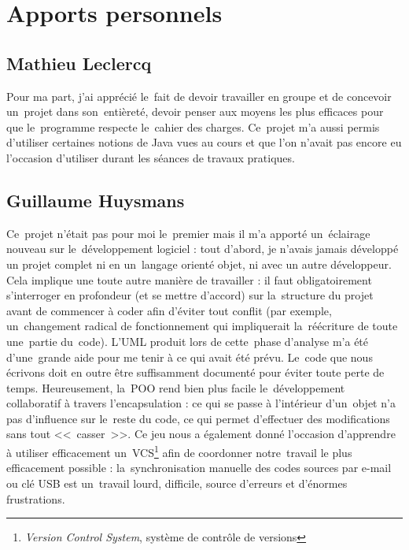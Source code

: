 \section{Apports personnels}

\subsection{Mathieu Leclercq}
Pour ma part, j'ai apprécié le~fait de devoir travailler en groupe et de concevoir un~projet dans son~entièreté,
devoir penser aux moyens les plus efficaces pour que le~programme respecte le~cahier des charges. 
Ce~projet m'a aussi permis d'utiliser certaines notions de Java vues au cours et que l'on n'avait pas encore eu 
l'occasion d'utiliser durant les séances de travaux pratiques.   

\subsection{Guillaume Huysmans}
Ce~projet n'était pas pour moi le~premier mais il m'a apporté un~éclairage nouveau sur le~développement logiciel : 
tout d'abord, je n'avais jamais développé un projet complet ni en un~langage orienté objet, ni avec un autre développeur. 
Cela implique une toute autre manière de travailler : il faut obligatoirement s'interroger en profondeur (et se mettre d'accord) 
sur la~structure du projet avant de commencer à coder afin d'éviter tout conflit (par exemple, un~changement radical 
de fonctionnement qui impliquerait la~réécriture de toute une~partie du~code). 
L'UML produit lors de cette~phase d'analyse m'a été d'une~grande aide pour me tenir à ce qui avait été prévu. 
Le~code que nous écrivons doit en outre être suffisamment documenté pour éviter toute perte de temps.
Heureusement, la~POO rend bien plus facile le~développement collaboratif à travers l'encapsulation : ce qui se passe à l'intérieur 
d'un~objet n'a pas d'influence sur le~reste du code, ce qui permet d'effectuer des modifications sans tout <<~casser~>>. 
Ce jeu nous a également donné l'occasion d'apprendre à utiliser efficacement 
un~VCS\footnote{\emph{Version Control System}, système de contrôle de versions} 
afin de coordonner notre~travail le plus efficacement possible : la~synchronisation manuelle des codes sources par e-mail ou 
clé USB est un~travail lourd, difficile, source d'erreurs et d'énormes frustrations.